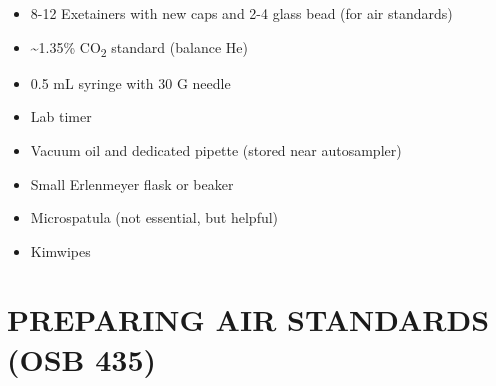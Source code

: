 \documentclass[]{article}
\providecommand{\tightlist}{%
  \setlength{\itemsep}{0pt}\setlength{\parskip}{0pt}}
\begin{document}
\begin{itemize}
\tightlist
\item
  8-12 Exetainers with new caps and 2-4 glass bead (for air standards)
\item
  \textasciitilde{}1.35\% CO\textsubscript{2} standard (balance He)
\item
  0.5 mL syringe with 30 G needle
\item
  Lab timer
\item
  Vacuum oil and dedicated pipette (stored near autosampler)
\item
  Small Erlenmeyer flask or beaker
\item
  Microspatula (not essential, but helpful)
\item
  Kimwipes
\end{itemize}

\section{PREPARING AIR STANDARDS (OSB
435)}\label{preparing-air-standards-osb-435}
\end{document}
